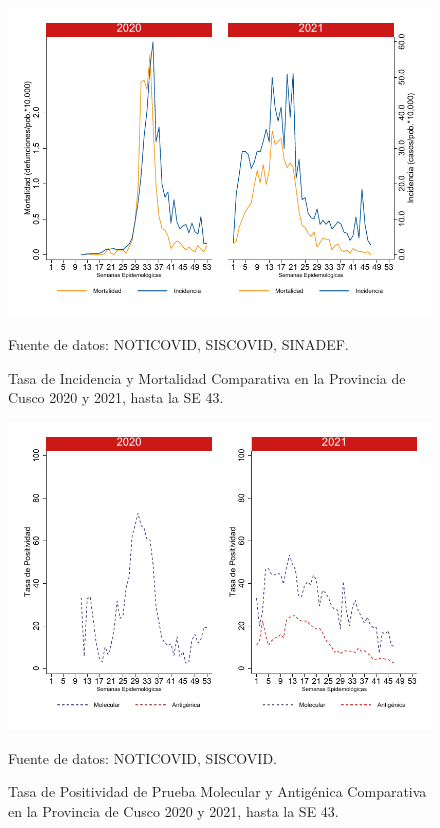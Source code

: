 \documentclass[12pt,a4paper,openany]{book}
\begin{document}
		\begin{figure}[h]
			\caption{Tasa de Incidencia y Mortalidad Comparativa en la Provincia de Cusco 2020 y 2021, hasta la SE 43.}\label{fig:inc_mort_cusco}
			\begin{center}
				\includegraphics[width=0.7\linewidth]{../figuras/incidencia_mortalidad_20_21_7}
			\end{center}
			{\footnotesize {Fuente de datos: NOTICOVID, SISCOVID, SINADEF.}}
		\end{figure}
		
		\begin{figure}[h]
			\caption{Tasa de Positividad de Prueba Molecular y Antigénica Comparativa en la Provincia de Cusco 2020 y 2021, hasta la SE 43.}\label{fig:positividad_cusco}
			\begin{center}
				\includegraphics[width=0.7\linewidth]{../figuras/positividad_20_21_7}
			\end{center}
			{\footnotesize {Fuente de datos: NOTICOVID, SISCOVID.}}
		\end{figure}
		
\end{document}
